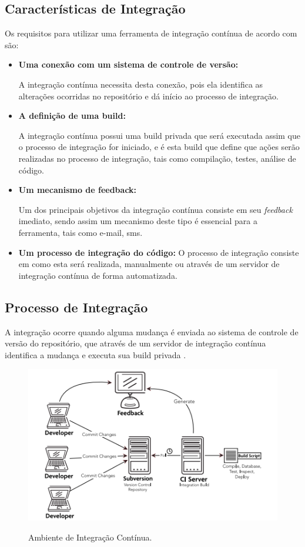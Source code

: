 \subsection{Características de Integração}
Os requisitos para utilizar uma ferramenta de integração contínua de acordo com  são:
\begin{itemize}
\item {\textbf{Uma conexão com um sistema de controle de versão:}}

A integração contínua necessita desta conexão, pois ela identifica as alterações ocorridas no repositório e dá início ao processo de integração.

\item {\textbf{A definição de uma build:}}

A integração contínua possui uma build privada que será executada assim que o processo de integração for iniciado, e é esta build que define que ações serão realizadas no processo de integração, tais como compilação, testes, análise de código.
\item {\textbf{Um mecanismo de feedback:}}

Um dos principais objetivos da integração contínua consiste em seu \textit{feedback} imediato, sendo assim um mecanismo deste tipo é essencial para a ferramenta, tais como e-mail, sms.
\item {\textbf{Um processo de integração do código: }}
O processo de integração consiste em como esta será realizada, manualmente ou através de um servidor de integração contínua de forma automatizada.

\end{itemize}

\subsection{Processo de Integração}
A integração ocorre quando alguma mudança é enviada ao sistema de controle de versão do repositório, que através de um servidor de integração contínua identifica a mudança e executa sua build privada \cite{mraz2013}. 


\begin{figure}[h]
\centering
\caption[Ambiente de Integração Contínua]{Ambiente de Integração Contínua.}
\includegraphics[scale=0.7]{./images/CI}
\label{fig:CI}
\end{figure}

